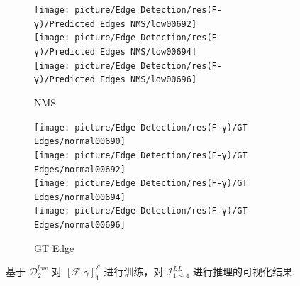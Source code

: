 \documentclass[a4paper]{ctexart}
\begin{document}
\begin{figure}[htbp]
\begin{subfigure}{0.16\textwidth}
			\texttt{[image: picture/Edge Detection/res(F-γ)/Predicted Edges NMS/low00692]} \\
			\texttt{[image: picture/Edge Detection/res(F-γ)/Predicted Edges NMS/low00694]} \\
			\texttt{[image: picture/Edge Detection/res(F-γ)/Predicted Edges NMS/low00696]}
			\caption{NMS}
		\end{subfigure}
		\begin{subfigure}{0.16\textwidth}
			\texttt{[image: picture/Edge Detection/res(F-γ)/GT Edges/normal00690]} \\
			\texttt{[image: picture/Edge Detection/res(F-γ)/GT Edges/normal00692]} \\
			\texttt{[image: picture/Edge Detection/res(F-γ)/GT Edges/normal00694]} \\
			\texttt{[image: picture/Edge Detection/res(F-γ)/GT Edges/normal00696]}
			\caption{GT Edge}
		\end{subfigure}
		\caption{基于 $\mathcal{D}^{low}_{2}$ 对 ${\left[\mathcal{F}\text{-}\gamma\right]}^{\mathcal{E}}_1$ 进行训练，对 $\mathcal{I}_{1 \sim 4}^{LL}$ 进行推理的可视化结果.}
	\end{figure}
	
	\renewcommand{\refname}{References}
	
	
		
		
		
		
		
		
	
	
	
	
	
\end{document}
